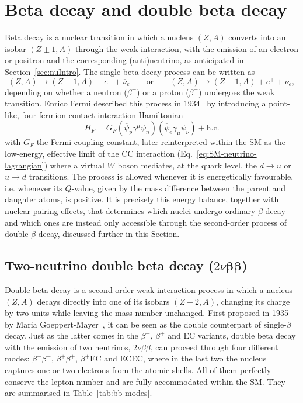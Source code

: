 \section{Beta decay and double beta decay}
Beta decay is a nuclear transition in which a nucleus $(Z, A)$ converts into an isobar $(Z \pm 1, A)$ through the weak interaction, with the emission of an electron or positron and the corresponding (anti)neutrino, as anticipated in Section~\ref{sec:nuIntro}. The single-beta decay process can be written as
\begin{equation}
    \label{eq:single-beta-decay}
    (Z, A) \longrightarrow (Z+1, A) + e^- + \overline{\nu}_e \qquad \text{or} \qquad 
    (Z, A) \longrightarrow (Z-1, A) + e^+ + \nu_e,
\end{equation}
depending on whether a neutron ($\beta^-$) or a proton ($\beta^+$) undergoes the weak transition. Enrico Fermi described this process in 1934~\cite{Fermi1934} by introducing a point-like, four-fermion contact interaction Hamiltonian
\begin{equation}
    H_F = G_F \left( \overline{\psi}_p \gamma^\mu \psi_n \right)\left( \overline{\psi}_e \gamma_\mu \psi_\nu \right) + \text{h.c.}
\end{equation} 
with $G_F$ the Fermi coupling constant, later reinterpreted within the \ac{SM} as the low-energy, effective limit of the \ac{CC} interaction (Eq.~\ref{eq:SM-neutrino-lagrangian}) where a virtual $W$ boson mediates, at the quark level, the $d \to u$ or $u \to d$ transitions. The process is allowed whenever it is energetically favourable, i.e. whenever its $Q$-value, given by the mass difference between the parent and daughter atoms, is positive. It is precisely this energy balance, together with nuclear pairing effects, that determines which nuclei undergo ordinary $\beta$ decay and which ones are instead only accessible through the second-order process of double-$\beta$ decay, discussed further in this Section.

\subsection{Two-neutrino double beta decay (\texorpdfstring{$2\nu\boldsymbol{\beta}\boldsymbol{\beta}$}{2vbb})}
\label{subsec:2nubetabeta}
Double beta decay is a second-order weak interaction process in which a nucleus $(Z, A)$ decays directly into one of its isobars $(Z\pm2, A)$, changing its charge by two units while leaving the mass number unchanged. First proposed in 1935 by Maria Goeppert-Mayer~\cite{firstDoubleBeta}, it can be seen as the double counterpart of single-$\beta$ decay. Just as the latter comes in the $\beta^-$, $\beta^+$ and \ac{EC} variants, double beta decay with the emission of two neutrinos, $2\nu\beta\beta$, can proceed through four different modes: $\beta^-\beta^-$, $\beta^+\beta^+$, $\beta^+$\ac{EC} and \ac{EC}\ac{EC}, where in the last two the nucleus captures one or two electrons from the atomic shells. All of them perfectly conserve the lepton number and are fully accommodated within the \ac{SM}. They are summarised in Table~\ref{tab:bb-modes}.


